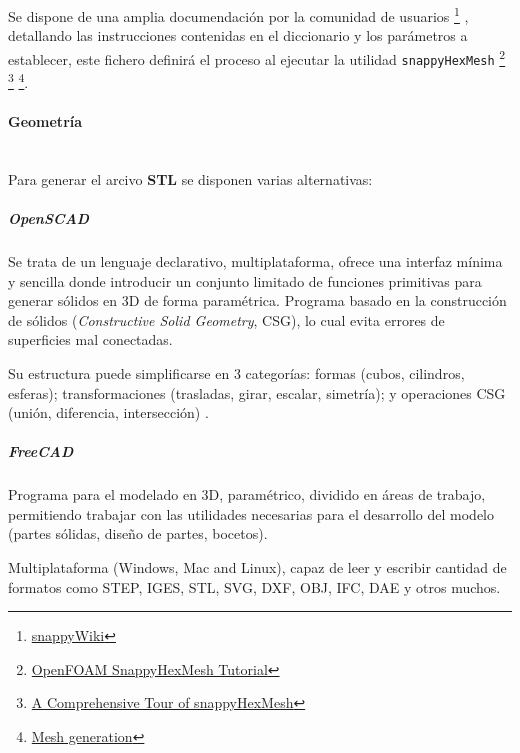 Se dispone de una amplia documendación por la comunidad de usuarios
\footnote{\href{https://sites.google.com/site/snappywiki/snappyhexmesh/snappyhexmeshdict\#TOC-geometry}{snappyWiki}}
, detallando las instrucciones contenidas en el diccionario y los
parámetros a establecer, este fichero definirá el proceso al ejecutar la
utilidad \texttt{snappyHexMesh}
 \footnote{\href{https://www.youtube.com/watch?v=ObsFQUiVi1U}{OpenFOAM
  SnappyHexMesh Tutorial}}
\footnote{\href{https://openfoamwiki.net/images/f/f0/Final-AndrewJacksonSlidesOFW7.pdf}{A
  Comprehensive Tour of snappyHexMesh}}
\footnote{\href{http://hmf.enseeiht.fr/travaux/projnum/book/export/html/1467}{Mesh
  generation}}.

\paragraph{Geometría}\label{header-n94} \\

Para generar el arcivo \textbf{STL} se disponen varias alternativas:

\subparagraph{OpenSCAD\cite{OpenSCAD}}\label{header-n97}

Se trata de un lenguaje declarativo, multiplataforma, ofrece una
interfaz mínima y sencilla donde introducir un conjunto limitado de
funciones primitivas para generar sólidos en 3D de forma paramétrica.
Programa basado en la construcción de sólidos (\emph{Constructive Solid
Geometry}, CSG), lo cual evita errores de superficies mal conectadas.

Su estructura puede simplificarse en 3 categorías: formas (cubos,
cilindros, esferas); transformaciones (trasladas, girar, escalar,
simetría); y operaciones CSG (unión, diferencia, intersección)
\cite{iamwil}\cite{CheatSheet}\cite{howtoOpenSCAD} .

\subparagraph{FreeCAD\cite{FreeCAD}}\label{header-n109}

Programa para el modelado en 3D, paramétrico, dividido en áreas de
trabajo, permitiendo trabajar con las utilidades necesarias para el
desarrollo del modelo (partes sólidas, diseño de partes, bocetos).

Multiplataforma (Windows, Mac and Linux), capaz de leer y escribir
cantidad de formatos como STEP, IGES, STL, SVG, DXF, OBJ, IFC, DAE y
otros muchos.

